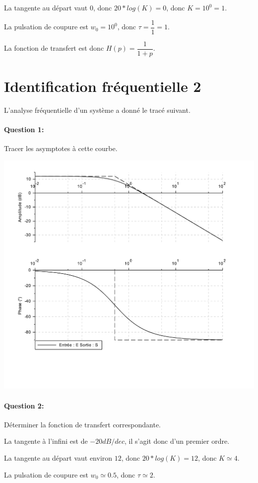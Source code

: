 La tangente au départ vaut $0$, donc $20*log(K)=0$, donc $K=10^0=1$.

La pulsation de coupure est $w_0=10^0$, donc $\tau=\dfrac{1}{1}=1$.

La fonction de transfert est donc $H(p)=\dfrac{1}{1+p}$.

\newpage

\section{Identification fréquentielle 2}

L'analyse fréquentielle d'un système a donné le tracé suivant.

\paragraph{Question 1:} Tracer les asymptotes à cette courbe.

\begin{center}
 \includegraphics[width=0.8\linewidth]{img/Bode2_c}
\end{center} 
\paragraph{Question 2:} Déterminer la fonction de transfert correspondante.

La tangente à l'infini est de $-20dB/dec$, il s'agit donc d'un premier ordre.

La tangente au départ vaut environ $12$, donc $20*log(K)=12$, donc $K\simeq 4$.

La pulsation de coupure est $w_0\simeq 0.5$, donc $\tau\simeq 2$.

